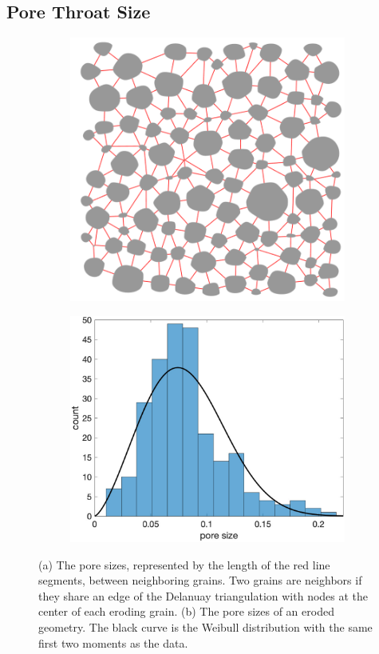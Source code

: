 \documentclass{jfm}
\begin{document}
\subsection{Pore Throat Size}
\label{sec:throats}
\begin{figure}
\begin{subfigure}[b]{0.5\textwidth}
\includegraphics*[height =0.8\linewidth]{./figs/triangulation_100b100}
\caption{}
\end{subfigure}
\begin{subfigure}[b]{0.5\textwidth}
\includegraphics*[height = 0.8\linewidth]{./figs/gap_hist100b100}
\caption{}
\end{subfigure}
\caption{\label{fig:Eroding100gap} (a) The pore sizes, represented by
the length of the red line segments, between neighboring grains. Two
grains are neighbors if they share an edge of the Delanuay triangulation
with nodes at the center of each eroding grain. (b) The pore sizes of an
eroded geometry. The black curve is the Weibull distribution with the
same first two moments as the data.}
\end{figure}
\end{document}

